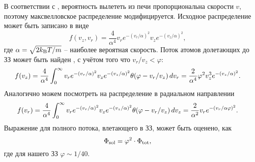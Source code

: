 В соответствии с \cite{ramsey_molecular_1985}, вероятность вылететь из печи пропорциональна скорости $v$, поэтому максвелловское распределение модифицируется. Исходное распределение может быть записано в виде
\begin{equation}
	f(v_z, v_r) = \frac{4}{\alpha^4} v_r e^{-(v_r/\alpha)^2} v_z e^{-(v_z/\alpha)^2},
\end{equation}
где $\alpha = \sqrt{2 k_{\textnormal{B}} T/m}$ -- наиболее вероятная скорость. Поток атомов долетающих до ЗЗ может быть найден \cite{tiecke_high-flux_2009}, с учётом того что
$v_r / v_z < \varphi$:
\begin{equation}
	f(v_z) = \frac{4}{\alpha^4} \int_{0}^{\infty}  v_r e^{-(v_r/\alpha)^2} v_z e^{-(v_z/\alpha)^2} \theta(\varphi - v_r/v_z) \, d v_r = \frac{2}{\alpha^4} \varphi^2 v_z^3 e^{-(v_z/\alpha)^2}.
\end{equation}
Аналогично можем посмотреть на распределение в радиальном направлении
\begin{equation}
	f(v_r) = \frac{4}{\alpha^4} \int_{0}^{\infty}  v_r e^{-(v_r/\alpha)^2} v_z e^{-(v_z/\alpha)^2} \theta(\varphi - v_r/v_z) \, d v_z = \frac{2}{\alpha^2} v_r e^{-(v_r/\alpha \varphi)^2}.
\end{equation}
Выражение для полного потока, влетающего в ЗЗ, может быть оценено, как
\begin{equation}
	\Phi_{\textnormal{sol}} = \varphi^2 \cdot \Phi_{\textnormal{tot}},
	\label{phisol}
\end{equation}
где для нашего ЗЗ $\varphi \sim 1/40$.  


















